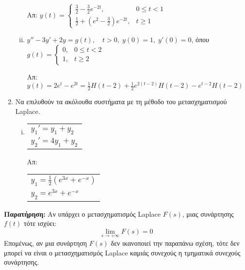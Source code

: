\begin{enumerate}
\begin{enumerate}[i)]
        \hfill Απ: $y(t)=\begin{cases} \frac{3}{2}-\frac{3}{2}e^{-2t},& 0\leq t<1 \\ 
        \frac{1}{2}+\left(e^2-\frac{3}{2}\right)e^{-2t}, & t\geq 1\end{cases}$

      \item $y''-3y'+2y=g(t),\quad t>0,\; y(0)=1,\; y'(0)=0$, όπου 
        $g(t)=\begin{cases} 0, & 0\leq t<2 \\ 1, & t\geq 2\end{cases}$

        \hfill Απ: $y(t)=2e^t-e^{2t}=\frac{1}{2}H(t-2)+\frac{1}{2}e^{2(t-2)}
        H(t-2)-e^{t-2}H(t-2)$
    \end{enumerate}

  \item Να επιλυθούν τα ακόλουθα συστήματα με τη μέθοδο του μετασχηματισμού Laplace.

    \begin{enumerate}[i)]
      \item \begin{tabular}{l} $y_1'=y_1+y_2$ \\ $y_2'=4y_1+y_2$\end{tabular} 
        \hfill Απ: \begin{tabular}{l} $y_1=\frac{1}{2}(e^{3x}+e^{-x})$ \\ 
        $y_2=e^{3x}+e^{-x}$\end{tabular}
    \end{enumerate}

\end{enumerate}

\vspace{\baselineskip}

\textbf{Παρατήρηση:} Αν υπάρχει ο μετασχηματισμός Laplace $F(s)$, μιας 
συνάρτησης $f(t)$ τότε ισχύει:
\[
  \lim\limits_{s\to+\infty}F(s)=0
\]
Επομένως, αν μια συνάρτηση $F(s)$ δεν ικανοποιεί την παραπάνω σχέση, τότε δεν μπορεί 
να είναι ο μετασχηματισμός Laplace καμιάς συνεχούς η τμηματικά συνεχούς συνάρτησης.



